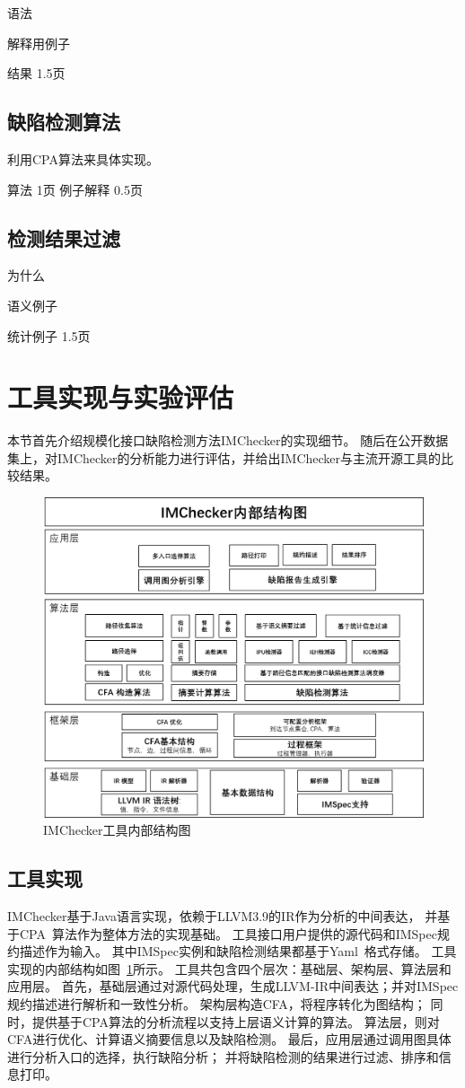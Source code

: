 语法

解释用例子

结果
1.5页
\subsection{缺陷检测算法}

利用CPA算法来具体实现。

算法
1页
例子解释
0.5页

%


\subsection{检测结果过滤}
为什么

语义例子

统计例子
1.5页
\section{工具实现与实验评估}
\label{sec:3.4}
本节首先介绍规模化接口缺陷检测方法IMChecker的实现细节。
随后在公开数据集上，对IMChecker的分析能力进行评估，并给出IMChecker与主流开源工具的比较结果。

\begin{figure}[t]
	\centering
	\includegraphics[width=0.9\linewidth]{figures/cp3-implementation.png}
	\caption{
		IMChecker工具内部结构图
	}
	\label{fig:3-4-implementation}
\end{figure}

\subsection{工具实现}
IMChecker基于Java语言实现，依赖于LLVM3.9的IR作为分析的中间表达，
并基于CPA~\cite{07-cav-cpachecker}算法作为整体方法的实现基础。
工具接口用户提供的源代码和IMSpec规约描述作为输入。
其中IMSpec实例和缺陷检测结果都基于Yaml~\cite{yaml}格式存储。
工具实现的内部结构如图~\ref{fig:3-4-implementation}所示。
工具共包含四个层次：基础层、架构层、算法层和应用层。
首先，基础层通过对源代码处理，生成LLVM-IR中间表达；并对IMSpec规约描述进行解析和一致性分析。
架构层构造CFA，将程序转化为图结构；
同时，提供基于CPA算法的分析流程以支持上层语义计算的算法。
算法层，则对CFA进行优化、计算语义摘要信息以及缺陷检测。
最后，应用层通过调用图具体进行分析入口的选择，执行缺陷分析；
并将缺陷检测的结果进行过滤、排序和信息打印。

